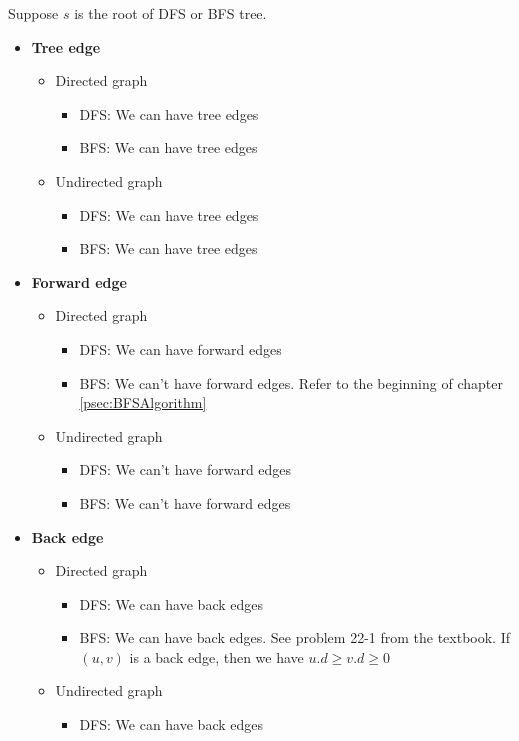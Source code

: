 \documentclass{book}
\begin{document}
	Suppose $s$ is the root of DFS or BFS tree.
	\begin{itemize}
		\item \textbf{Tree edge}
		\begin{itemize}
			\item Directed graph
			\begin{itemize}
				\item DFS: We can have tree edges
				\item BFS: We can have tree edges
			\end{itemize}
			\item Undirected graph
			\begin{itemize}
				\item DFS: We can have tree edges
				\item BFS: We can have tree edges
			\end{itemize}				
		\end{itemize}
		\item \textbf{Forward edge}
		\begin{itemize}
			\item Directed graph
			\begin{itemize}
				\item DFS: We can have forward edges
				\item BFS: We can't have forward edges. Refer to the beginning of chapter \ref{psec:BFSAlgorithm}
			\end{itemize}
			\item Undirected graph
			\begin{itemize}
				\item DFS: We can't have forward edges
				\item BFS: We can't have forward edges
			\end{itemize}				
		\end{itemize}
		\item \textbf{Back edge}
		\begin{itemize}
			\item Directed graph
			\begin{itemize}
				\item DFS: We can have back edges
				\item BFS: We can have back edges. See problem 22-1 from the textbook. If $(u, v)$ is a back edge, then we have $u.d \ge v.d \ge 0$
			\end{itemize}
			\item Undirected graph
			\begin{itemize}
				\item DFS: We can have back edges

\end{itemize}
\end{itemize}
\end{itemize}
\end{document}
